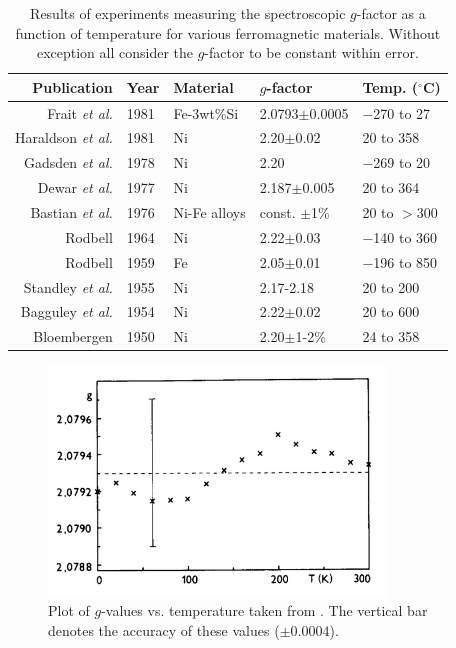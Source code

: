 \documentclass[preprint,12pt]{elsarticle}
\begin{document}
{\begin{table}[h]
\caption{\label{tab:gfactor_Tdep}Results of experiments measuring the spectroscopic $g$-factor as a function of temperature for various ferromagnetic materials. Without exception all consider the $g$-factor to be constant within error.}
\begin{center}
\begin{tabular}{|r|l|l|l|l|}\hline
Publication&Year&Material&$g$-factor&Temp. ($^{\circ}$C)\\\hline
Frait {\it et al.} \cite{Pust1981}&1981&Fe-3wt\%Si&2.0793$\pm$0.0005&$-$270 to 27\\
Haraldson {\it et al.} \cite{Haraldson1981}&1981&Ni&2.20$\pm$0.02&20 to 358\\
Gadsden {\it et al.} \cite{Gadsden1978}&1978&Ni&2.20&$-$269 to 20\\
Dewar {\it et al.} \cite{Dewar1977}&1977&Ni&2.187$\pm$0.005&20 to 364\\
Bastian {\it et al.} \cite{Bastian1976_2}&1976&Ni-Fe alloys&const. $\pm$1\% &20 to $>$300\\
Rodbell \cite{Rodbell1964}&1964&Ni&2.22$\pm$0.03&$-$140 to 360\\
Rodbell \cite{Rodbell1959}&1959&Fe&2.05$\pm$0.01&$-$196 to 850\\
Standley {\it et al.}\cite{Standley1955}&1955&Ni&2.17-2.18&20 to 200\\
Bagguley {\it et al.}\cite{Bagguley1954}&1954&Ni&2.22$\pm$0.02&20 to 600\\
Bloembergen \cite{Bloembergen1950}&1950&Ni&2.20$\pm$1-2\%&24 to 358\\\hline

\end{tabular}
\end{center}
\end{table}

\begin{figure}[h]
\centering
\includegraphics[width=0.8\textwidth]{Frait1981.png}
\caption{Plot of $g$-values vs. temperature taken from \cite{Pust1981}. The vertical bar denotes the accuracy of these values ($\pm0.0004$). }
\label{fig:Frait1981}
\end{figure}

}
\end{document}

